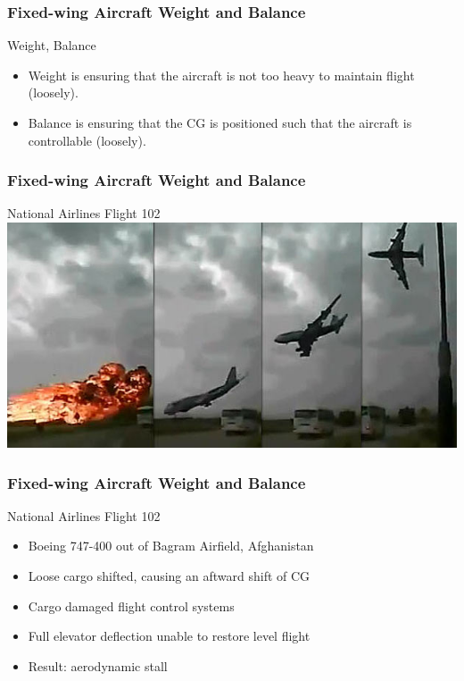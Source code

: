 \begin{frame}
\frametitle{Fixed-wing Aircraft Weight and Balance}
\begin{block}{Weight, Balance}
\begin{itemize}
\item Weight is ensuring that the aircraft is not too heavy to maintain flight \tiny{(loosely)}.
\item Balance is ensuring that the CG is positioned such that the aircraft is controllable \tiny{(loosely)}.
\end{itemize}
\end{block}
\end{frame}

\begin{frame}
\frametitle{Fixed-wing Aircraft Weight and Balance}
\begin{block}{National Airlines Flight 102}
\includegraphics[height=0.5\textheight]{image/bagram-102.jpg}
\end{block}
\end{frame}

\begin{frame}
\frametitle{Fixed-wing Aircraft Weight and Balance}
\begin{block}{National Airlines Flight 102}
\begin{itemize}
\item<1-> Boeing 747-400 out of Bagram Airfield, Afghanistan
\item<2-> Loose cargo shifted, causing an aftward shift of CG
\item<3-> Cargo damaged flight control systems
\item<4-> Full elevator deflection unable to restore level flight
\item<5-> Result: aerodynamic stall
\end{itemize}
\end{block}
\end{frame}

